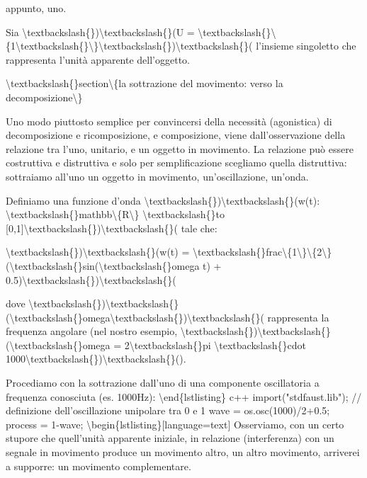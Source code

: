 \documentclass[a4paper,11pt]{article}
\begin{document}
appunto, uno.

Sia \textbackslash{}textbackslash\{\})\textbackslash{}textbackslash\{\}(U = \textbackslash{}textbackslash\{\}\textbackslash{}\{1\textbackslash{}textbackslash\{\}\textbackslash{}\}\textbackslash{}textbackslash\{\})\textbackslash{}textbackslash\{\}( l'insieme singoletto che rappresenta l'unit\`a apparente
dell'oggetto.

\textbackslash{}textbackslash\{\}section\textbackslash{}\{la sottrazione del movimento: verso la decomposizione\textbackslash{}\}

Uno modo piuttosto semplice per convincersi della necessit\`a (agonistica)
di decomposizione e ricomposizione, e composizione, viene
dall'osservazione della relazione tra l'uno, unitario, e un oggetto in
movimento. La relazione pu\`o essere costruttiva e distruttiva e solo per
semplificazione scegliamo quella distruttiva: sottraiamo all'uno
un oggetto in movimento, un'oscillazione, un'onda.

Definiamo una funzione d'onda \textbackslash{}textbackslash\{\})\textbackslash{}textbackslash\{\}(w(t): \textbackslash{}textbackslash\{\}mathbb\textbackslash{}\{R\textbackslash{}\} \textbackslash{}textbackslash\{\}to [0,1]\textbackslash{}textbackslash\{\})\textbackslash{}textbackslash\{\}( tale che:

\textbackslash{}textbackslash\{\})\textbackslash{}textbackslash\{\}(w(t) = \textbackslash{}textbackslash\{\}frac\textbackslash{}\{1\textbackslash{}\}\textbackslash{}\{2\textbackslash{}\}(\textbackslash{}textbackslash\{\}sin(\textbackslash{}textbackslash\{\}omega t) + 0.5)\textbackslash{}textbackslash\{\})\textbackslash{}textbackslash\{\}(

dove \textbackslash{}textbackslash\{\})\textbackslash{}textbackslash\{\}(\textbackslash{}textbackslash\{\}omega\textbackslash{}textbackslash\{\})\textbackslash{}textbackslash\{\}( rappresenta la frequenza angolare (nel nostro esempio,
\textbackslash{}textbackslash\{\})\textbackslash{}textbackslash\{\}(\textbackslash{}textbackslash\{\}omega = 2\textbackslash{}textbackslash\{\}pi \textbackslash{}textbackslash\{\}cdot 1000\textbackslash{}textbackslash\{\})\textbackslash{}textbackslash\{\}().

Procediamo con la sottrazione dall'uno di una componente oscillatoria a
frequenza conosciuta (es. 1000Hz):
          \textbackslash{}end\{lstlisting\}
c++
import("stdfaust.lib");
// definizione dell'oscillazione unipolare tra 0 e 1
wave = os.osc(1000)/2+0.5;
process = 1-wave;
          \textbackslash{}begin\{lstlisting\}[language=text]
Osserviamo, con un certo stupore che quell'unit\`a apparente iniziale,
in relazione (interferenza) con un segnale in movimento produce un
movimento altro, un altro movimento, arriverei a supporre:
un movimento complementare.
\end{document}

